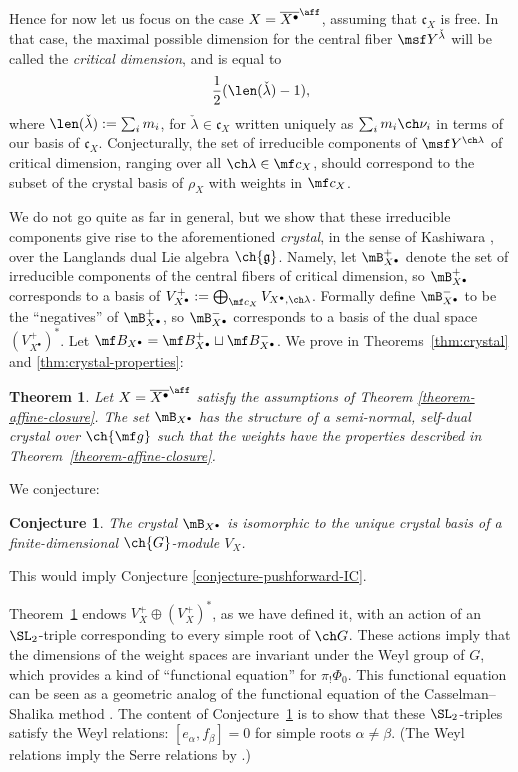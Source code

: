 \documentclass[final]{amsart}
\newtheorem{thm}[subsubsection]{Theorem}
\newtheorem{conj}[subsubsection]{Conjecture}
\theoremstyle{remark}
\theoremstyle{definition}
\numberwithin{equation}{section}
\begin{document}
Hence for now let us focus on the case $X=\overline{X^\bullet}^\aff$, assuming that $\mathfrak c_X$ is free. In that case, the maximal possible dimension for the central fiber $\msf Y^{\check\lambda}$ will be called the \emph{critical dimension}, and is equal to 
\[ \frac{1}{2} (\len(\check\lambda)-1),\]
where $\len(\check\lambda) := \sum_i m_i$, for $\check\lambda\in \mathfrak c_X$ written uniquely
as $\sum_i m_i \ch\nu_i$ in terms of our basis of $\mathfrak c_X$. 
Conjecturally, the set of irreducible components of $\msf Y^{\ch\lambda}$ of critical dimension,
ranging over all $\ch\lambda \in \mf c_X$, should correspond to the subset
of the crystal basis 
of $\rho_X$ with weights in $\mf c_X$. 


We do not go quite as far in general, but we show that these irreducible components give rise to the aforementioned \emph{crystal}, in the sense of Kashiwara \cite{Kas93}, over the Langlands dual Lie algebra $\ch{\mathfrak g}$.
Namely, let $\mB_{X^\bullet}^+$ denote the set of irreducible components of 
the central fibers of critical dimension, so $\mB_{X^\bullet}^+$ corresponds to a basis 
of $V_{X^\bullet}^+ := \bigoplus_{\mf c_X} V_{X^\bullet,\ch\lambda}$. 
Formally define $\mB_{X^\bullet}^-$ to be the ``negatives'' of $\mB_{X^\bullet}^+$, so 
$\mB_{X^\bullet}^-$ corresponds to a basis of the dual space $(V_{X^\bullet}^+)^*$. 
Let $\mf B_{X^\bullet} = \mf B_{X^\bullet}^+ \sqcup \mf B_{X^\bullet}^-$. We prove in 
Theorems~\ref{thm:crystal} and \ref{thm:crystal-properties}:

\begin{thm} 
\label{theorem-crystal}
Let $X=\overline{X^\bullet}^\aff$ satisfy the assumptions of Theorem \ref{theorem-affine-closure}. The set $\mB_{X^\bullet}$ has the structure of a semi-normal, self-dual crystal over 
$\ch{\mf g}$ such that the weights have the properties described in Theorem~\ref{theorem-affine-closure}. 
\end{thm}

We conjecture:

\begin{conj} 
\label{conjecture-crystal}
The crystal $\mB_{X^\bullet}$ is isomorphic to the unique crystal basis 
of a finite-dimensional $\ch{G}$-module $V_X$. 
\end{conj} 
This would imply Conjecture \ref{conjecture-pushforward-IC}. 

\medskip

Theorem~\ref{theorem-crystal} endows $V_X^+ \oplus (V_X^+)^*$, as we have defined it, 
with an action of an $\SL_2$-triple corresponding to every simple root of $\ch G$. 
These actions imply that the dimensions of the weight spaces 
are invariant under the Weyl group of $G$, which provides a kind of 
``functional equation'' for $\pi_!\Phi_0$. This functional equation can be seen as a geometric analog of the functional equation of the Casselman--Shalika method \cite{C, CS, SaSph}.
The content of 
Conjecture~\ref{conjecture-crystal} is to show that these $\SL_2$-triples satisfy 
the Weyl relations: $[e_\alpha, f_\beta]=0$ for simple roots $\alpha\ne \beta$.
(The Weyl relations imply the Serre relations by \cite[Corollary 4.3.2]{Chriss-Ginzburg}.)   
\end{document}
